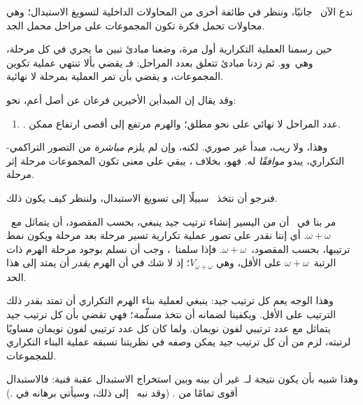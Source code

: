 \documentclass[../../../include/open-logic-section]{subfiles}
\begin{document}

ندع الآن~\limofsize{} جانبًا، وننظر في طائفة أخرى من المحاولات
الداخلية لتسويغ الاستبدال؛ وهي محاولات تحمل فكرة تكون المجموعات على
مراحل محمل الجد.

حين رسمنا العملية التكرارية أول مرة، وضعنا مبادئ تبين ما يجري في كل
مرحلة، وهي~\stageshier و\stagesord و\stagesacc. ثم زدنا مبادئ تتعلق
بعدد المراحل: فـ\stagessucc{} يقضي بألا تنتهي عملية تكوين المجموعات،
و\stagesinf{} يقضي بأن تمر العملية بمرحلة لا نهائية.

وقد يقال إن المبدأين الأخيرين فرعان عن أصل أعم، نحو:
\begin{enumerate}
	\item[] \stagesinex. عدد المراحل لا نهائي على نحو مطلق؛ والهرم
	مرتفع إلى أقصى ارتفاع ممكن.
\end{enumerate}
وهذا، ولا ريب، مبدأ غير صوري. لكنه، وإن لم يلزم \emph{مباشرة}
من التصور التراكمي-التكراري، يبدو \emph{موافقًا} له. فهو، بخلاف
\limofsize{}، يبقي على معنى تكون المجموعات مرحلة إثر مرحلة.

فنرجو أن نتخذ~\stagesinex{} سبيلًا إلى تسويغ الاستبدال، ولننظر كيف
يكون ذلك.

مر بنا في~ أن من اليسير إنشاء ترتيب جيد
ينبغي، بحسب المقصود، أن يتماثل مع~$\omega+\omega$. أي إننا نقدر على
تصور عملية تكرارية تسير مرحلة بعد مرحلة ويكون نمط ترتيبها، بحسب
المقصود،~$\omega+\omega$. فإذا سلمنا~\stagesinex، وجب أن نسلم بوجود
مرحلة الهرم ذات الرتبة~$\omega+\omega$ على الأقل، وهي
$V_{\omega+\omega}$؛ إذ لا شك في أن الهرم \emph{يقدر} أن يمتد إلى
هذا الحد.

وهذا الوجه يعم كل ترتيب جيد: ينبغي لعملية بناء الهرم التكراري أن
تمتد بقدر ذلك الترتيب على الأقل. ويكفينا لضمانه أن نتخذ
 \emph{مسلّمة}؛
فهي تقضي بأن كل ترتيب جيد يتماثل مع عدد ترتيبي لفون نويمان. ولما كان
كل عدد ترتيبي لفون نويمان مساويًا لرتبته، لزم من
 أن كل ترتيب جيد
يمكن وصفه في نظريتنا تسبقه عملية البناء التكراري للمجموعات.

وهذا شبيه بأن يكون نتيجة لـ\stagesinex. غير أن بينه وبين استخراج
الاستبدال عقبة فنية: فالاستبدال أقوى تمامًا من
.
(وقد نبه~\citet[\S13.2]{Potter2004} إلى ذلك، وسيأتي برهانه في
.)
\end{document}
